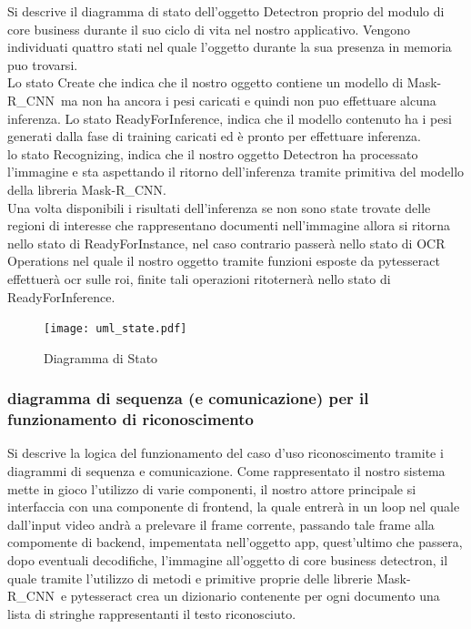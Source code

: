 \documentclass[12pt,a4paper]{article}
\newcommand{\mrcnn}{Mask-R\_CNN}
\begin{document}
Si descrive il diagramma di stato dell'oggetto Detectron proprio del
modulo di core business durante il suo ciclo di vita  nel nostro
applicativo.
Vengono individuati quattro stati nel quale l'oggetto durante la sua presenza
in memoria puo trovarsi.\\
Lo stato Create che indica che il nostro oggetto contiene un modello di
\mrcnn\ ma non ha ancora i pesi caricati e quindi non puo effettuare
alcuna inferenza.
Lo stato ReadyForInference, indica che il modello contenuto ha i pesi
generati dalla fase di training caricati ed è pronto per effettuare
inferenza.\\
lo stato Recognizing, indica che il nostro oggetto Detectron ha
processato l'immagine e sta aspettando il ritorno dell'inferenza tramite
primitiva del modello della libreria \mrcnn.\\
Una volta disponibili i risultati dell'inferenza se non sono state trovate
delle regioni di interesse che rappresentano documenti nell'immagine
allora si ritorna nello stato di ReadyForInstance, nel caso contrario
passerà nello stato di OCR Operations nel quale il nostro oggetto
tramite funzioni esposte da pytesseract effettuerà ocr sulle roi, finite
tali operazioni ritoternerà nello stato di ReadyForInference.

\begin{figure}[H]
    \caption{Diagramma di Stato}
    \centering
    \texttt{[image: uml\_state.pdf]}
\end{figure}

\subsubsection{diagramma di sequenza (e comunicazione) per il
funzionamento di riconoscimento}

Si descrive la logica del funzionamento del caso d'uso riconoscimento
tramite i diagrammi di sequenza e comunicazione.
Come rappresentato il nostro sistema mette in gioco l'utilizzo di varie
componenti, il nostro attore principale si interfaccia con una
componente di frontend, la quale entrerà in un loop nel quale dall'input
video andrà a prelevare il frame corrente, passando tale frame alla
compomente di backend, impementata nell'oggetto app, quest'ultimo che
passera, dopo eventuali decodifiche, l'immagine all'oggetto di core
business detectron, il quale tramite l'utilizzo di metodi e primitive
proprie delle librerie \mrcnn\ e pytesseract crea un dizionario
contenente per ogni documento una lista di stringhe rappresentanti il
testo riconosciuto.
\end{document}
